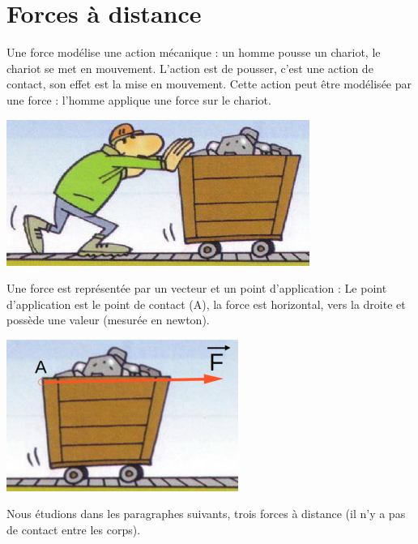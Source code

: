 \chapter{Forces à distance}
%
Une force modélise une action mécanique : un homme pousse un chariot, le chariot se met en mouvement. L'action est de pousser, c'est une action de contact, son effet est la mise en mouvement. Cette action peut être modélisée par une force : l'homme applique une force sur le chariot.

\begin{center}
\includegraphics[scale=0.6]{./forces/chariotPousse}
\end{center}

Une force est représentée par un vecteur et un point d'application : Le point d'application est le point de contact (A), la force est horizontal, vers la droite et possède une valeur (mesurée en newton).

\begin{center}
\includegraphics[scale=0.6]{./forces/chariotVecteur}
\end{center}

Nous étudions dans les paragraphes suivants, trois forces à distance (il n'y a pas de contact entre les corps).


%

%

%
%
